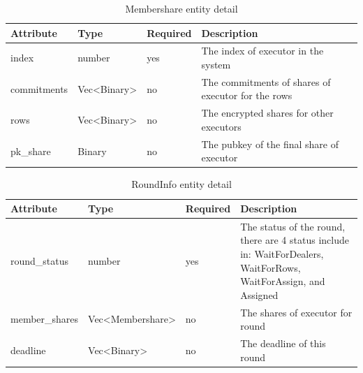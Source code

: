 \documentclass[../Main.tex]{subfiles}
\begin{document}
\begin{table}[H]
  \centering
  \begin{tabular}{|l|l|l|p{8cm}|}
\hline
\rowcolor[HTML]{F56B00} 
\textbf{Attribute}                  & \textbf{Type}                      & \textbf{Required} & \textbf{Description}                               \\ \hline
\cellcolor[HTML]{FFFFFF}index       & number                             & yes               & The index of executor in the system                \\ \hline
\cellcolor[HTML]{FFFFFF}commitments & Vec\textless{}Binary\textgreater{} & no                & The commitments of shares of executor for the rows \\ \hline
\cellcolor[HTML]{FFFFFF}rows        & Vec\textless{}Binary\textgreater{} & no                & The encrypted shares for other executors           \\ \hline
pk\_share                           & Binary                             & no                & The pubkey of the final share of executor          \\ \hline
\end{tabular}
 \caption{Membershare entity detail}
    \label{fig:membershare-entity-detail}
\end{table}

\begin{table}[H]
  \centering
  \begin{tabular}{|l|l|l|p{7cm}|}
\hline
\rowcolor[HTML]{F56B00} 
\textbf{Attribute}                     & \textbf{Type}                           & \textbf{Required} & \textbf{Description}                                                                                             \\ \hline
\cellcolor[HTML]{FFFFFF}round\_status  & number                                  & yes               & The status of the round, there are 4 status include in: WaitForDealers, WaitForRows, WaitForAssign, and Assigned \\ \hline
\cellcolor[HTML]{FFFFFF}member\_shares & Vec\textless{}Membershare\textgreater{} & no                & The shares of executor for round                                                                                 \\ \hline
\cellcolor[HTML]{FFFFFF}deadline       & Vec\textless{}Binary\textgreater{}      & no                & The deadline of this round                                                                                       \\ \hline
\end{tabular}
 \caption{RoundInfo entity detail}
    \label{fig:roundinfo-entity-detail}
\end{table}
\end{document}
